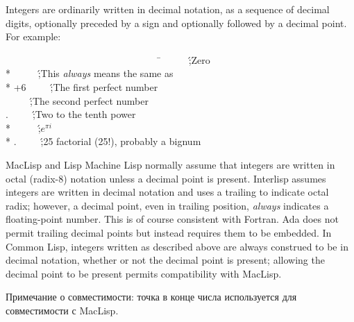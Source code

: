 Integers are ordinarily written in decimal notation, as a sequence
of decimal digits, optionally preceded by a sign and optionally followed
by a decimal point.
For example:
\begin{lisp}
~~~~~~~~~~~~~~~~~~~~~~~~~~~~~~~~\=\kill
{}~~~~~\';\textrm{Zero} \\*
~~~~~\';\textrm{This \emph{always} means the same as } \\*
\>+6~~~~~\';\textrm{The first perfect number} \\
~~~~~\';\textrm{The second perfect number} \\
.~~~~~\';\textrm{Two to the tenth power} \\*
~~~~~\';\textrm{$e^{\pi i}$} \\*
.~~~~~\';\textrm{25 factorial (25!), probably a bignum}
\end{lisp}

\beforenoterule
\begin{incompatibility}
MacLisp and Lisp Machine Lisp normally assume that integers
are written in octal (radix-8) notation unless a decimal
point is present.
Interlisp assumes integers are written in decimal notation and uses a
trailing  to indicate octal radix; however, a decimal point,
even in trailing position, \emph{always} indicates a floating-point number.
This is of course consistent with Fortran.  Ada does not permit
trailing decimal points but instead requires them to be embedded.
In Common Lisp, integers written as described
above are always construed to be
in decimal notation, whether or not the decimal point is present;
allowing the decimal point to be present permits compatibility with
MacLisp.

Примечание о совместимости: точка в конце числа используется для
совместимости с MacLisp.
\end{incompatibility}
\afternoterule


